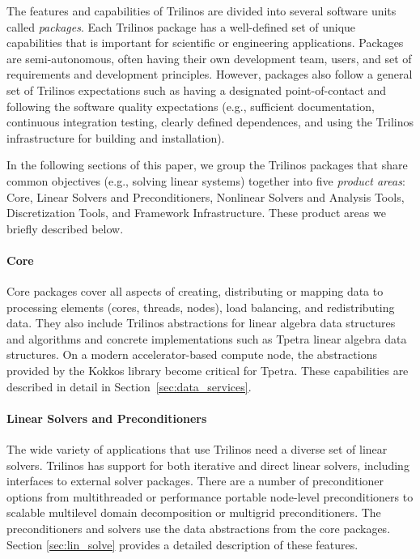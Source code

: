 
The features and capabilities of Trilinos are divided into several software units called \textit{packages}.
Each Trilinos package has a well-defined set of unique capabilities that is important for scientific or engineering applications. Packages are semi-autonomous, often having their own development team, users, and set of requirements and development principles.  However, packages also follow a general set of Trilinos expectations such as having a designated point-of-contact and following the software quality expectations (e.g., sufficient documentation, continuous integration testing, clearly defined dependences, and using the Trilinos infrastructure for building and installation).

In the following sections of this paper, we group the Trilinos packages that share common objectives (e.g., solving linear systems) together into five \textit{product areas}:  Core, Linear Solvers and Preconditioners, Nonlinear Solvers and Analysis Tools, Discretization Tools, and Framework Infrastructure.  These product areas we briefly described below.

\paragraph{Core} Core packages cover all aspects of creating, distributing or mapping data to processing elements (cores, threads, nodes), load balancing, and redistributing data. They also include Trilinos abstractions for linear algebra data structures and algorithms and concrete implementations such as Tpetra linear algebra data structures. On a modern accelerator-based compute node, the abstractions provided by the Kokkos library become critical for Tpetra. These capabilities are described in detail in Section~\ref{sec:data_services}.

\paragraph{Linear Solvers and Preconditioners} The wide variety of applications that use Trilinos need a diverse set of linear solvers. Trilinos has support for both iterative and direct linear solvers, including interfaces to external solver packages. There are a number of preconditioner options from multithreaded or performance portable node-level preconditioners to scalable multilevel domain decomposition or multigrid preconditioners. The preconditioners and solvers use the data abstractions from the core packages. Section \ref{sec:lin_solve} provides a detailed description of these features.

